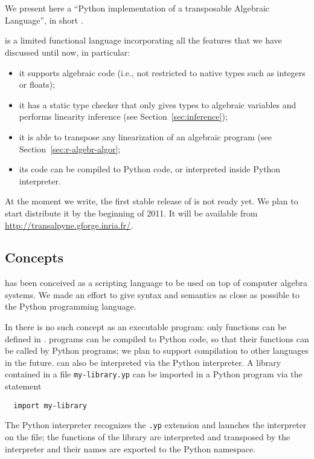 

\section{\tALpy{}}
\label{sec:texttttransalpyne}

\lstset{language=python}

We present here a ``Python implementation of a transposable Algebraic
Language'', in short \tALpy{}.

\tALpy{} is a limited functional language incorporating all the
features that we have discussed until now, in particular:
\begin{itemize}
\item it supports algebraic code (i.e., not restricted to native types
  such as integers or floats);
\item it has a static type checker that only gives types to algebraic
  variables and performs linearity inference (see
  Section~\ref{sec:inference});
\item it is able to transpose any linearization of an algebraic
  program (see Section~\ref{sec:r-algebr-algor};
\item its code can be compiled to Python code, or interpreted inside
  Python interpreter.
\end{itemize}

At the moment we write, the first stable release of \tALpy{} is not
ready yet. We plan to start distribute it by the beginning of 2011. It
will be available from \url{http://transalpyne.gforge.inria.fr/}.


\subsection{Concepts}
\tALpy{} has been conceived as a scripting language to be used on top
of computer algebra systems. We made an effort to give syntax and
semantics as close as possible to the Python programming language.

In \tALpy{} there is no such concept as an executable program: only
functions can be defined in \tALpy{}.  \tALpy{} programs can be
compiled to Python code, so that their functions can be called by
Python programs; we plan to support compilation to other languages in
the future. \tALpy{} can also be interpreted via the Python
interpreter. A \tALpy{} library contained in a file
\texttt{my-library.yp} can be imported in a Python program via the
statement
\begin{lstlisting}
  import my-library
\end{lstlisting}
The Python interpreter recognizes the \texttt{.yp} extension and
launches the \tALpy{} interpreter on the file; the functions of the
library are interpreted and transposed by the \tALpy{} interpreter and
their names are exported to the Python namespace.

